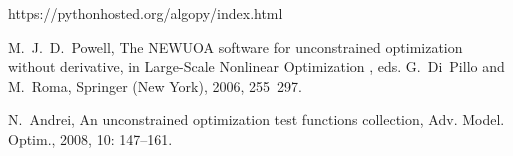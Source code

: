 \documentclass[final,1p,times]{elsarticle}
\begin{document}
\begin{thebibliography}{99}
https://pythonhosted.org/algopy/index.html

M.~J.~D.~Powell,
The NEWUOA software for unconstrained optimization without derivative, in
Large-Scale Nonlinear Optimization , eds. G.~Di~Pillo
and M.~Roma, Springer (New York), 2006, 255~297.

N.~Andrei, 
An unconstrained optimization test functions collection,
Adv. Model. Optim.,
2008, 10: 147--161.


\end{thebibliography}
\end{document}
